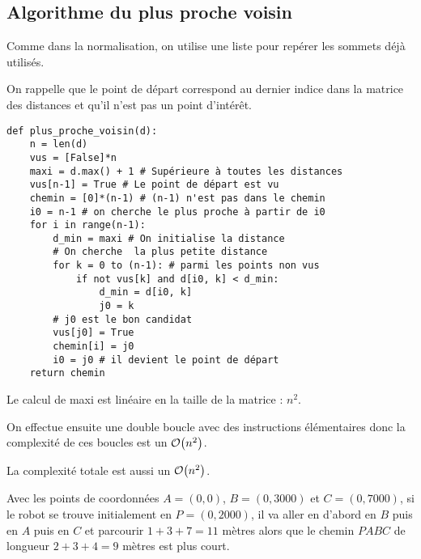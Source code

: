\subsection{Algorithme du plus proche voisin} 
\begin{Exercise}[title = {\bf II.C.1)}]
Comme dans la normalisation, on utilise une liste pour repérer les sommets déjà utilisés.

On rappelle que le point de départ correspond au dernier indice dans la matrice des distances et qu'il n'est pas un point d'intérêt.
\begin{lstlisting}
def plus_proche_voisin(d):
    n = len(d)
    vus = [False]*n
    maxi = d.max() + 1 # Supérieure à toutes les distances
    vus[n-1] = True # Le point de départ est vu 
    chemin = [0]*(n-1) # (n-1) n'est pas dans le chemin
    i0 = n-1 # on cherche le plus proche à partir de i0
    for i in range(n-1):        
        d_min = maxi # On initialise la distance
        # On cherche  la plus petite distance
        for k = 0 to (n-1): # parmi les points non vus
            if not vus[k] and d[i0, k] < d_min:
                d_min = d[i0, k]
                j0 = k
        # j0 est le bon candidat
        vus[j0] = True
        chemin[i] = j0
        i0 = j0 # il devient le point de départ
    return chemin
\end{lstlisting}
\end{Exercise}
\newpage
\begin{Exercise}[title = {\bf II.C.2)}]
Le calcul de maxi est linéaire en la taille de la matrice  : $n^2$.

On effectue ensuite une double boucle avec des instructions élémentaires donc la complexité de ces boucles est un ${\cal O}\bigl(n^2\bigr)$.

La complexité totale est aussi un ${\cal O}\bigl(n^2\bigr)$.
\end{Exercise}
\begin{Exercise}[title = {\bf II.C.3)}]
Avec les points de coordonnées $A=(0, 0)$, $B=(0, 3000)$ et $C=(0, 7000)$, si le robot se trouve initialement en $P=(0, 2000)$, il va aller en d'abord en $B$ puis en $A$ puis en $C$ et parcourir $1+3+7=11$ mètres alors que le chemin $PABC$ de longueur $2+3+4=9$ mètres est plus court.
\end{Exercise}
